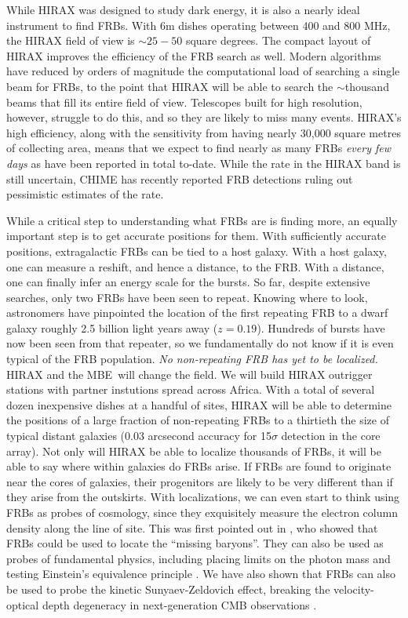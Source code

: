 \documentclass[letterpaper,11pt,preprint]{aastex}
\newcommand{\mbe}{{\rm MBE}}
\begin{document}
While HIRAX was designed to study dark energy, it is also a nearly
ideal instrument to find FRBs.  With 6m dishes operating between 400
and 800 MHz, the HIRAX field of view is $\sim 25-50$ square degrees.
The compact layout of HIRAX improves the efficiency of the FRB search
as well.  Modern algorithms have reduced by orders of magnitude the
computational load of searching a single beam for FRBs, to the point
that HIRAX will be able to search the $\sim$thousand beams that fill
its entire field of view.  Telescopes built for high resolution,
however, struggle to do this, and so they are likely to miss many
events.  HIRAX's high efficiency, along with the sensitivity from
having nearly 30,000 square metres of collecting area, means that we
expect to find nearly as many FRBs {\textit{every few days}} as have been
reported in total to-date.  While the rate in the HIRAX band is still
uncertain, CHIME has recently reported FRB detections
\citep{CHIME_ATEL,chime_frbs} ruling out pessimistic estimates of the rate.

While a critical step to understanding what FRBs are is finding more,
an equally important step is to get accurate positions for them.  With
sufficiently accurate positions, extragalactic FRBs can be tied to a
host galaxy.  With a host galaxy, one can measure a reshift, and hence
a distance, to the FRB.  With a distance, one can finally infer an
energy scale for the bursts.  So far, despite extensive searches, only
two FRBs have been seen to repeat.  Knowing where to look, astronomers
have pinpointed the location of the first repeating FRB to a dwarf
galaxy roughly 2.5 billion light years away ($z=0.19$).  Hundreds of
bursts have now been seen from that repeater, so we fundamentally do
not know if it is even typical of the FRB population.  {\textit{No
    non-repeating FRB has yet to be localized.}}  HIRAX and the
\mbe\ will change the field.  We will build HIRAX outrigger stations
with partner instutions spread across Africa.  With a total of several
dozen inexpensive dishes at a handful of sites, HIRAX will be able to
determine the positions of a large fraction of non-repeating FRBs to a
thirtieth the size of typical distant galaxies (0.03 arcsecond
accuracy for 15$\sigma$ detection in the core array).  Not only will
HIRAX be able to localize thousands of FRBs, it will be able to say
where within galaxies do FRBs arise.  If FRBs are found to originate
near the cores of galaxies, their progenitors are likely to be very
different than if they arise from the outskirts.  With localizations,
we can even start to think using FRBs as probes of cosmology, since
they exquisitely measure the electron column density along the line of
site. This was first pointed out in \citet{McQuinn2014}, who showed
that FRBs could be used to locate the ``missing baryons''.  They can
also be used as probes of fundamental physics, including placing
limits on the photon mass \citep{bonetti2017} and testing Einstein's
equivalence principle \citep{frb_equivalence}.  We have also shown
that FRBs can also be used to probe the kinetic Sunyaev-Zeldovich
effect, breaking the velocity-optical depth degeneracy in
next-generation CMB observations \citep{Madhavacheril18}.
\end{document}
